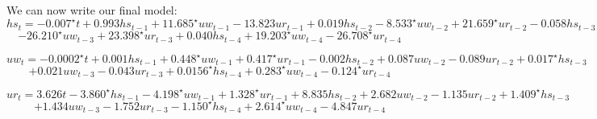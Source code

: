 \documentclass[11pt]{article}
\begin{document}
We can now write our final model:
$$ hs_t = -0.007^{\star}t + 0.993hs_{t-1} + 11.685^{\star}uw_{t-1} - 13.823ur_{t-1} + 0.019hs_{t-2} - 8.533^{\star}uw_{t-2} + 21.659^{\star}ur_{t-2} - 0.058hs_{t-3} $$
$$ - 26.210^{\star}uw_{t-3} + 23.398^{\star}ur_{t-3} + 0.040hs_{t-4} + 19.203^{\star}uw_{t-4} - 26.708^{\star}ur_{t-4} $$

$$ uw_t = -0.0002^{\star}t + 0.001hs_{t-1} + 0.448^{\star}uw_{t-1} + 0.417^{\star}ur_{t-1} - 0.002hs_{t-2} + 0.087uw_{t-2} - 0.089ur_{t-2} + 0.017^{\star}hs_{t-3} $$
$$ + 0.021uw_{t-3} - 0.043ur_{t-3} + 0.0156^{\star}hs_{t-4} + 0.283^{\star}uw_{t-4} - 0.124^{\star}ur_{t-4} $$

$$ ur_t = 3.626t - 3.860^{\star}hs_{t-1} - 4.198^{\star}uw_{t-1} + 1.328^{\star}ur_{t-1} + 8.835hs_{t-2} + 2.682uw_{t-2} - 1.135ur_{t-2} + 1.409^{\star}hs_{t-3} $$
$$ + 1.434uw_{t-3} - 1.752ur_{t-3} - 1.150^{\star}hs_{t-4} + 2.614^{\star}uw_{t-4} - 4.847ur_{t-4} $$
\end{document}
